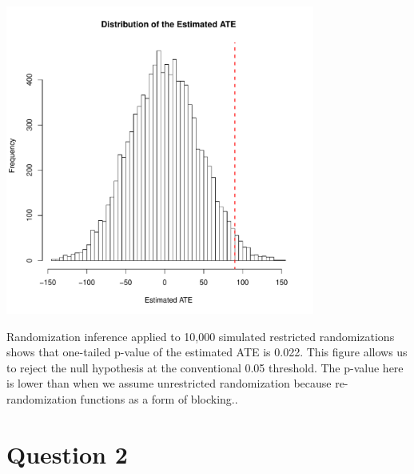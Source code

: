 \documentclass[11pt,notitlepage]{article}\usepackage[]{graphicx}\usepackage[]{color}
\makeatletter
\newenvironment{kframe}{%
 \def\at@end@of@kframe{}%
 \ifinner\ifhmode%
  \def\at@end@of@kframe{\end{minipage}}%
  \begin{minipage}{\columnwidth}%
 \fi\fi%
 \def\FrameCommand##1{\hskip\@totalleftmargin \hskip-\fboxsep
 \colorbox{shadecolor}{##1}\hskip-\fboxsep
     \hskip-\linewidth \hskip-\@totalleftmargin \hskip\columnwidth}%
 \MakeFramed {\advance\hsize-\width
   \@totalleftmargin\z@ \linewidth\hsize
   \@setminipage}}%
 {\par\unskip\endMakeFramed%
 \at@end@of@kframe}
\newenvironment{knitrout}{}{} %
\makeatother
\begin{document}
\begin{enumerate}[a)]
\begin{knitrout}
{\centering \includegraphics[width=4in,height=4in]{figure/PS13-unnamed-chunk-4-1} 

}



\end{knitrout}

Randomization inference applied to 10,000 simulated restricted randomizations shows that one-tailed p-value of the estimated ATE is 0.022. This figure allows us to reject the null hypothesis at the conventional 0.05 threshold.  The p-value here is lower than when we assume unrestricted randomization because re-randomization functions as a form of blocking..
\end{enumerate}

\section*{Question 2}
\begin{knitrout}
\color{fgcolor}\begin{kframe}
\begin{verbatim}






\end{verbatim}
\end{kframe}
\end{knitrout}
\end{document}
